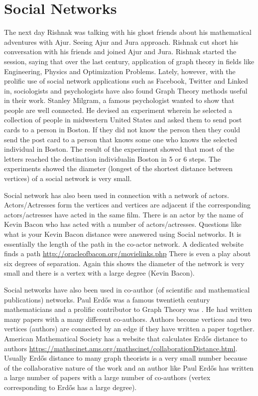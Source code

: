 \chapter{Social Networks}

 The next day Rishnak was talking with his ghost friends about his mathematical adventures with Ajur. Seeing Ajur and Jura approach. Rishnak cut short his conversation with his friends and joined Ajur and Jura. Rishnak started the session, saying that over the last century, application of graph theory in fields like Engineering, Physics and Optimization Problems. Lately, however,  with the prolific use of social network applications such as Facebook, Twitter and Linked in, sociologists and psychologists have also found Graph Theory methods useful in their work.  
Stanley Milgram, a famous psychologist wanted to show that people are well connected. He devised an experiment wherein he selected a collection of people in midwestern United States and asked them to send post cards to a person in Boston. If they did not know the person then they could send the post card to a person that knows some one who knows the selected individual in Boston. The result of the experiment showed that most of the letters reached the destination individualin Boston in 5 or 6 steps. The experiments showed the diameter (longest of the shortest distance between vertices) of a social network is very small.

Social network has also been used in connection with a network of actors. Actors/Actresses form the vertices and vertices are adjacent if the corresponding actors/actresses have acted in the same film. There is an actor by the name of Kevin Bacon who has acted with a number of actors/actresses. Questions like what is your Kevin Bacon distance were answered using Social networks. It is essentially the length of the path  in the co-actor network. A dedicated website finds a path \url{http://oracleofbacon.org/movielinks.php} There is even a play about six degrees of separation. Again this shows the diameter of the network is very small and there is a vertex with a large degree (Kevin Bacon).

Social networks have also been used in co-author (of scientific and mathematical publications) networks. Paul Erd\H{o}s was a famous twentieth century mathematicians and a prolific contributor to Graph Theory was . He had written many papers with a many different  co-authors. Authors become vertices and two vertices (authors) are connected by an edge if they have written a paper together. American Mathematical Society has a website that calculates Erd\H{o}s distance to authors
\url{https://mathscinet.ams.org/mathscinet/collaborationDistance.html}. Usually Erd\H{o}s distance to many graph theorists is a very small number because of the collaborative nature of the work and an author like Paul Erd\H{o}s has written a large number of papers with a large number of co-authors (vertex corresponding to Erd\H{o}s has a large degree).


